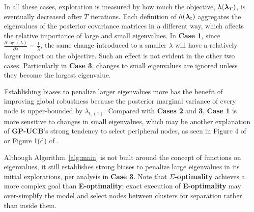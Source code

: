 In all these cases, exploration is measured by how much the objective, $h(\boldsymbol{\lambda}_T)$, is eventually decreased after $T$ iterations. 
Each definition of $h(\boldsymbol{\lambda}_t)$ aggregates the eigenvalues of the posterior covariance matrices in a different way, which 
affects the relative importance of large and small eigenvalues. In \textbf{Case 1}, since $\frac{\partial \log(\lambda)}{\partial \lambda}=\frac{1}{\lambda}$, the same change introduced to a smaller $\lambda$ will have a relatively larger impact on the objective.
Such an effect is not evident in the other two cases. 
Particularly in \textbf{Case 3}, changes to small eigenvalues are ignored unless they become the largest eigenvalue. 


Establishing biases to penalize larger eigenvalues more has the benefit of improving global robustness because the posterior marginal variance of every node is upper-bounded by $\lambda_{t,(1)}$. 
Compared with \textbf{Cases 2} and \textbf{3}, \textbf{Case 1} is more sensitive to changes in small eigenvalues, which may be another explanation
of \textbf{GP-UCB}'s strong tendency to select peripheral nodes, as seen in Figure 4 of \cite{MIG} or Figure 1(d) of \cite{gotovos2013active}. 

Although Algorithm~\ref{alg:main} is not built around the concept of functions on eigenvalues, it still establishes strong biases to penalize large eigenvalues in its initial explorations, per analysis in \textbf{Case 3}. 
Note that \textbf{$\Sigma$-optimality} achieves a more complex goal than \textbf{E-optimality}; exact execution of \textbf{E-optimality} may over-simplify the model and select nodes between clusters for separation rather than inside them.







